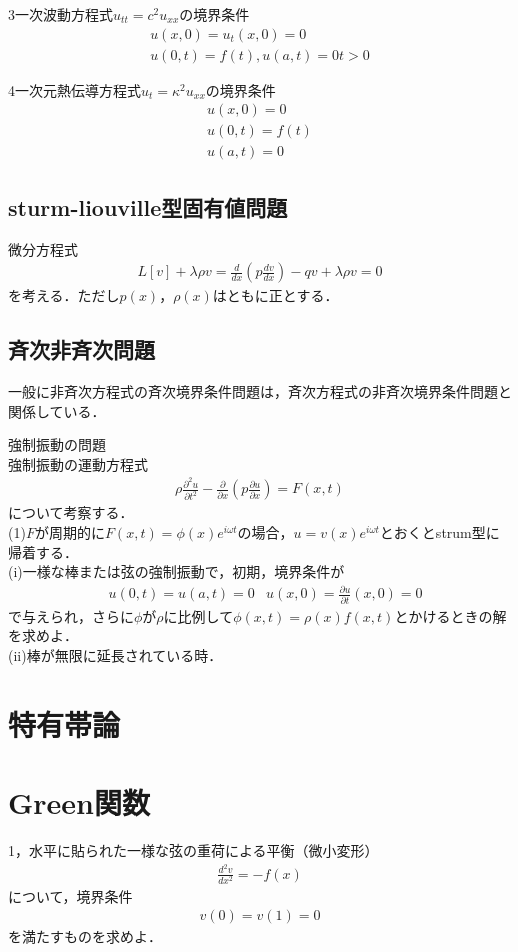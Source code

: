 \documentclass[a4j]{jarticle}
\begin{document}
3一次波動方程式$u_{tt}=c^2u_{xx}$の境界条件
\begin{align*}
 u(x,0)=u_t(x,0)=0\\
 u(0,t)=f(t),u(a,t)=0 t>0
\end{align*}

4一次元熱伝導方程式$u_t=\kappa^2u_{xx}$の境界条件
\begin{align*}
 u(x,0)=0\\
 u(0,t)=f(t)\\
 u(a,t)=0
\end{align*}



\subsection{sturm-liouville型固有値問題}
微分方程式
\begin{align*}
 L[v]+\lambda\rho v =\frac{d}{dx}\left(p\frac{dv}{dx}\right)-qv+\lambda\rho v=0
\end{align*}
を考える．ただし$p(x)$，$\rho(x)$はともに正とする．


\subsection{斉次非斉次問題}
一般に非斉次方程式の斉次境界条件問題は，斉次方程式の非斉次境界条件問題と関係している．


強制振動の問題\\
強制振動の運動方程式
\begin{align*}
 \rho\frac{\partial^2 u}{\partial t^2}-\frac{\partial}{\partial x}\left(p\frac{\partial u}{\partial x}\right)=F(x,t)
\end{align*}
について考察する．\\
(1)$F$が周期的に$F(x,t)=\phi (x)e^{i\omega t}$の場合，$u=v(x)e^{i\omega t}$とおくとstrum型に帰着する．\\
(i)一様な棒または弦の強制振動で，初期，境界条件が
\begin{align*}
& u(0,t)=u(a,t)=0&u(x,0)=\frac{\partial u}{\partial t}(x,0)=0
\end{align*}
で与えられ，さらに$\phi$が$\rho$に比例して$\phi (x,t)=\rho (x)f(x,t)$とかけるときの解を求めよ．\\
(ii)棒が無限に延長されている時．\\



\section{特有帯論}



\section{Green関数}

1，水平に貼られた一様な弦の重荷による平衡（微小変形）
\begin{align*}
 \frac{d^2v}{dx^2}=-f(x)
\end{align*}
について，境界条件
\begin{align*}
 v(0)=v(1)=0
\end{align*}
を満たすものを求めよ．\\
\end{document}
